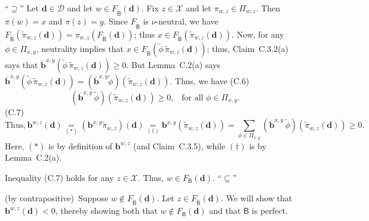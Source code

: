 \documentclass[
]{article}
\begin{document}
``\(\supseteq\)'' Let \(\mathbf{d} \in \mathcal{D}\) and let
\(w \in F_{\widetilde{\mathsf{B}}}\left( \mathbf{d} \right)\). Fix
\(z \in \mathcal{X}\) and let \(\pi_{w,z} \in \Pi_{w,z}\). Then
\(\pi(w) = x\) and \(\pi(z) = y\). Since \(F_{\widetilde{\mathsf{B}}}\)
is \(\nu\)-neutral, we have
\(F_{\widetilde{\mathsf{B}}}\left( {\widetilde{\pi}}_{w,z}\left( \mathbf{d} \right) \right) = \pi_{w,z}\left( F_{\widetilde{\mathsf{B}}}\left( \mathbf{d} \right) \right)\);
thus
\(x \in F_{\widetilde{\mathsf{B}}}\left( {\widetilde{\pi}}_{w,z}\left( \mathbf{d} \right) \right)\).
Now, for any \(\phi \in \Pi_{x,y}\), neutrality implies that
\(x \in F_{\widetilde{\mathsf{B}}}\left( \widetilde{\phi}\,{\widetilde{\pi}}_{w,z}\left( \mathbf{d} \right) \right)\);
thus, Claim~C.3.2(a) says that
\({\overline{\mathbf{b}}}^{x,y}\left( \widetilde{\phi}\,{\widetilde{\pi}}_{w,z}\left( \mathbf{d} \right) \right) \geq 0\).
But Lemma~C.2(a) says
\({\overline{\mathbf{b}}}^{x,y}\left( \widetilde{\phi}\,{\widetilde{\pi}}_{w,z}\left( \mathbf{d} \right) \right) = \left( {\overline{\mathbf{b}}}^{x,y}\widetilde{\phi} \right)\left( {\widetilde{\pi}}_{w,z}\left( \mathbf{d} \right) \right)\).
Thus, we have
(C.6)\[\left( {\overline{\mathbf{b}}}^{x,y}\,\widetilde{\phi} \right)\left( {\widetilde{\pi}}_{w,z}\left( \mathbf{d} \right) \right) \geq 0\text{,}\quad\text{for~all~}\phi \in \Pi_{x,y}\text{.}\](C.7)\[\text{Thus},\mathbf{b}^{w,z}\left( \mathbf{d} \right)\underset{( \ast )}{=}\left( \mathbf{b}^{x,y}{\widetilde{\pi}}_{w,z} \right)\left( \mathbf{d} \right)\underset{( \dagger )}{=}\mathbf{b}^{x,y}\left( {\widetilde{\pi}}_{w,z}\left( \mathbf{d} \right) \right)\underset{}{=}\sum\limits_{\phi \in \Pi_{x,y}}\left( {\overline{\mathbf{b}}}^{x,y}\,\widetilde{\phi} \right)\left( {\widetilde{\pi}}_{w,z}\left( \mathbf{d} \right) \right)\underset{}{\geq}0\text{.}\]
Here, \(( \ast )\) is by definition of \(\mathbf{b}^{w,z}\) (and
Claim~C.3.5), while \(( \dagger )\) is by Lemma~C.2(a).

Inequality (C.7) holds for any \(z \in \mathcal{X}\). Thus,
\(w \in F_{\mathsf{B}}\left( \mathbf{d} \right)\). ``\(\subseteq\)''

(by contrapositive)~Suppose
\(w \notin F_{\widetilde{\mathsf{B}}}\left( \mathbf{d} \right)\). Let
\(z \in F_{\widetilde{\mathsf{B}}}\left( \mathbf{d} \right)\). We will
show that \(\mathbf{b}^{w,z}\left( \mathbf{d} \right) < 0\), thereby
showing both that \(w \notin F_{\mathsf{B}}\left( \mathbf{d} \right)\)
and that \(\mathsf{B}\) is perfect.
\end{document}
